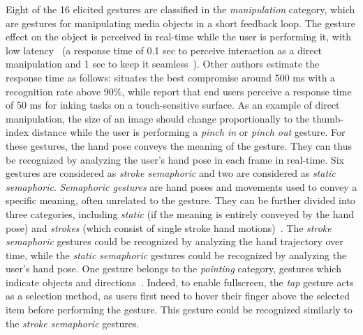 Eight of the 16 elicited gestures are classified in the \textit{manipulation} category, which are gestures for manipulating media objects in a short feedback loop. The gesture effect on the object is perceived in real-time while the user is performing it, with low latency~\cite{Aigner:2012} (\eg a response time of 0.1 sec to perceive interaction as a direct manipulation and 1 sec to keep it seamless~\cite{Nielsen:1994}).
Other authors estimate the response time as follows: \cite{Chen:2017} situates the best compromise around 500 ms with a recognition rate above 90\%, while \cite{Annett:2014} report that end users perceive a response time of 50 ms for inking tasks on a touch-sensitive surface.
As an example of direct manipulation, the size of an image should change proportionally to the thumb-index distance while the user is performing a \textit{pinch in} or \textit{pinch out} gesture. For these gestures, the hand pose conveys the meaning of the gesture. They can thus be recognized by analyzing the user's hand pose in each frame in real-time. Six gestures are considered as \textit{stroke semaphoric} and two are considered as \textit{static semaphoric}. \textit{Semaphoric gestures} are hand poses and movements used to convey a specific meaning, often unrelated to the gesture. They can be further divided into three categories, including \textit{static} (if the meaning is entirely conveyed by the hand pose) and \textit{strokes} (which consist of single stroke hand motions)~\cite{Aigner:2012}. The \textit{stroke semaphoric} gestures could be recognized by analyzing the hand trajectory over time, while the \textit{static semaphoric} gestures could be recognized by analyzing the user's hand pose.
One gesture belongs to the \textit{pointing} category, \ie gestures which indicate objects and directions~\cite{Aigner:2012}. Indeed, to enable fullscreen, the \textit{tap} gesture acts as a selection method, as users first need to hover their finger above the selected item before performing the gesture. This gesture could be recognized similarly to the \textit{stroke semaphoric} gestures.


